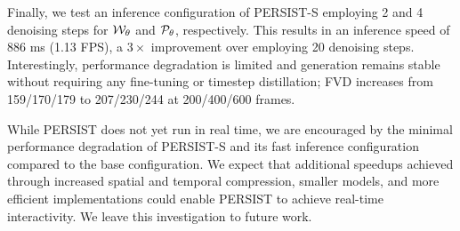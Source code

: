 \begin{subappendices}
Finally, we test an inference configuration of PERSIST-S employing 2 and 4 denoising steps for ${\mathcal{W}}_\theta$ and ${\mathcal{P}}_\theta$, respectively. This results in an inference speed of 886 ms (1.13 FPS), a $3\times$ improvement over employing 20 denoising steps. Interestingly, performance degradation is limited and generation remains stable without requiring any fine-tuning or timestep distillation; FVD increases from 159/170/179 to 207/230/244 at 200/400/600 frames.

While PERSIST does not yet run in real time, we are encouraged by the minimal performance degradation of PERSIST-S and its fast inference configuration compared to the base configuration. We expect that additional speedups achieved through increased spatial and temporal compression, smaller models, and more efficient implementations could enable PERSIST to achieve real-time interactivity. We leave this investigation to future work.

\end{subappendices}

